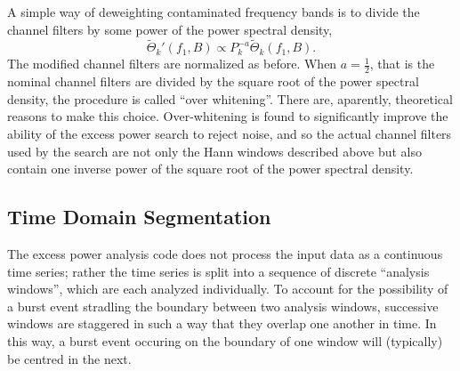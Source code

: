 \documentclass[10pt]{article}
\begin{document}
A simple way of deweighting contaminated frequency bands is to divide the
channel filters by some power of the power spectral density,
\begin{equation}
\tilde{\Theta}_{k}'(f_{1}, B)
   \propto P_{k}^{-a} \tilde{\Theta}_{k}(f_{1}, B).
\end{equation}
The modified channel filters are normalized as before.  When \(a =
\frac{1}{2}\), that is the nominal channel filters are divided by the
square root of the power spectral density, the procedure is called ``over
whitening''.  There are, aparently, theoretical reasons to make this
choice.  Over-whitening is found to significantly improve the ability of
the excess power search to reject noise, and so the actual channel filters
used by the search are not only the Hann windows described above but also
contain one inverse power of the square root of the power spectral density.


\subsection{Time Domain Segmentation}


%
%


The excess power analysis code does not process the input data as a
continuous time series;  rather the time series is split into a sequence of
discrete ``analysis windows'', which are each analyzed individually.  To
account for the possibility of a burst event stradling the boundary between
two analysis windows, successive windows are staggered in such a way that
they overlap one another in time.  In this way, a burst event occuring on
the boundary of one window will (typically) be centred in the next.
\end{document}
